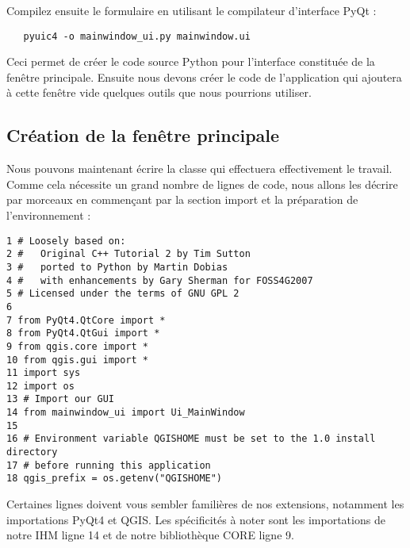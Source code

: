 Compilez ensuite le formulaire en utilisant le compilateur d'interface PyQt :

\begin{verbatim}
   pyuic4 -o mainwindow_ui.py mainwindow.ui
\end{verbatim}

Ceci permet de créer le code source Python pour l'interface constituée de la fenêtre principale. Ensuite nous devons créer le code de l'application qui ajoutera à cette fenêtre vide quelques outils que nous pourrions utiliser.

\subsection{Création de la fenêtre principale}

Nous pouvons maintenant écrire la classe  qui effectuera effectivement le travail.
Comme cela nécessite un grand nombre de lignes de code, nous allons les décrire par morceaux en commençant par la section import et la préparation de l'environnement :

\begin{verbatim}
1 # Loosely based on:
2 #   Original C++ Tutorial 2 by Tim Sutton
3 #   ported to Python by Martin Dobias
4 #   with enhancements by Gary Sherman for FOSS4G2007
5 # Licensed under the terms of GNU GPL 2
6
7 from PyQt4.QtCore import *
8 from PyQt4.QtGui import *
9 from qgis.core import *
10 from qgis.gui import *
11 import sys
12 import os
13 # Import our GUI
14 from mainwindow_ui import Ui_MainWindow
15 
16 # Environment variable QGISHOME must be set to the 1.0 install directory
17 # before running this application
18 qgis_prefix = os.getenv("QGISHOME")
\end{verbatim}

Certaines lignes doivent vous sembler familières de nos extensions, notamment les importations PyQt4 et QGIS. Les spécificités à noter sont les importations de notre IHM ligne 14 et de notre bibliothèque CORE ligne 9.

